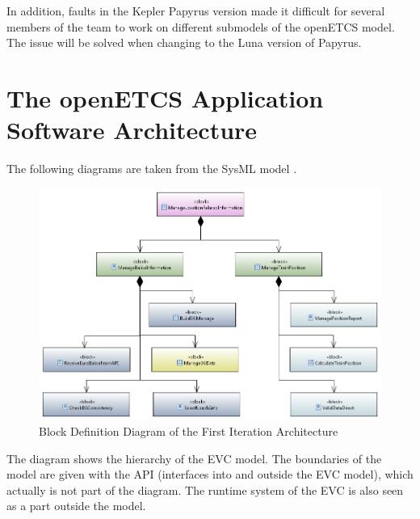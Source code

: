 \documentclass{template/openetcs_report}
\begin{document}
In addition, faults in the Kepler Papyrus version made it difficult for several members of the team to work on different submodels of the openETCS model. The issue will be solved when changing to the Luna version of Papyrus.

\section{The openETCS Application Software Architecture}


The following diagrams are taken from the SysML model \cite{sysml-model}.

\begin{figure}[h]
\centering
\includegraphics[scale=0.6]{../images/FunctionalArchitectureBDD.png}
\caption{Block Definition Diagram of the First Iteration Architecture}
\end{figure}

The diagram shows the hierarchy of the EVC model. The boundaries of the model are given with the API (interfaces into and outside the EVC model), which actually is not part of the diagram. The runtime system of the EVC is also seen as a part outside the model.
\end{document}
